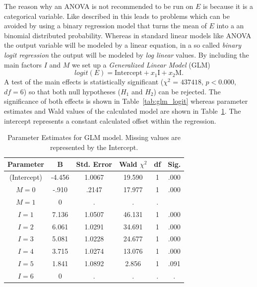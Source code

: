 The reason why an ANOVA is not recommended to be run on $E$ is because it is a categorical variable. Like described in \cite{jaeger2008} this leads to problems which can be avoided by using a binary regression model that turns the mean of $E$ into a an binomial distributed probability. Whereas in standard linear models like ANOVA the output variable will be modeled by a linear equation, in a so called \emph{binary logit regression} the output will be modeled by \emph{log linear} values. By including the main factors $I$ and $M$ we set up a \emph{Generalized Linear Model} (GLM)
\begin{equation}
	logit(E) =  \text{Intercept} + x_1 \text{I} + x_2 \text{M} .
	\label{eq:logit_main}
\end{equation}
A test of the main effects is statistically significant ($\chi^2$ = $437418$, $p < 0.000$, $df = 6$) so that both null hypotheses ($H_1$ and $H_2$) can be rejected. The significance of both effects is shown in Table~\ref{tab:glm_logit} whereas parameter estimates and Wald values of the calculated model are shown in Table~\ref{tab:glm_logit_parameter_estimates}. The intercept represents a constant calculated offset within the regression.

\begin{table}
\center
\scriptsize
\begin{tabular}{cccccc}
\toprule[1.5pt]
Parameter & B & Std. Error & Wald $\chi^2$ & df & Sig. \\
\midrule
(Intercept) & -4.456 & 1.0067 & 19.590 & 1 & .000\\
$M=0$ & -.910 & .2147 & 17.977 & 1 & .000\\
$M=1$ & 0 & . & . & . &  \\
$I=1$ & 7.136 & 1.0507 & 46.131 & 1 & .000\\
$I=2$ & 6.061 & 1.0291 & 34.691 & 1 & .000\\
$I=3$ & 5.081 & 1.0228 & 24.677 & 1 & .000\\
$I=4$ & 3.715 & 1.0274 & 13.076 & 1 & .000\\
$I=5$ & 1.841 & 1.0892 & 2.856 & 1 & .091\\
$I=6$ & 0 & . & . & . & .\\
\bottomrule[1.5pt]
\end{tabular}
\caption{Parameter Estimates for GLM model. Missing values are represented by the Intercept.}
\label{tab:glm_logit_parameter_estimates}
\end{table}

